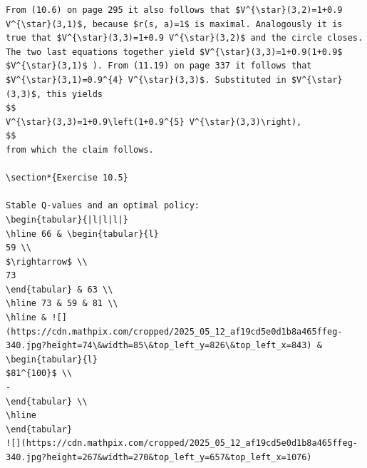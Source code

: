 \documentclass[10pt]{book}
\begin{document}
\begin{center}
\begin{enumerate}
\begin{center}
\begin{center}
\begin{center}
\begin{center}
\begin{center}
\begin{verbatim}
From (10.6) on page 295 it also follows that $V^{\star}(3,2)=1+0.9 V^{\star}(3,1)$, because $r(s, a)=1$ is maximal. Analogously it is true that $V^{\star}(3,3)=1+0.9 V^{\star}(3,2)$ and the circle closes. The two last equations together yield $V^{\star}(3,3)=1+0.9(1+0.9$ $V^{\star}(3,1)$ ). From (11.19) on page 337 it follows that $V^{\star}(3,1)=0.9^{4} V^{\star}(3,3)$. Substituted in $V^{\star}(3,3)$, this yields
$$
V^{\star}(3,3)=1+0.9\left(1+0.9^{5} V^{\star}(3,3)\right),
$$
from which the claim follows.

\section*{Exercise 10.5}

Stable Q-values and an optimal policy:
\begin{tabular}{|l|l|l|}
\hline 66 & \begin{tabular}{l}
59 \\
$\rightarrow$ \\
73
\end{tabular} & 63 \\
\hline 73 & 59 & 81 \\
\hline & ![](https://cdn.mathpix.com/cropped/2025_05_12_af19cd5e0d1b8a465ffeg-340.jpg?height=74\&width=85\&top_left_y=826\&top_left_x=843) & \begin{tabular}{l}
$81^{100}$ \\
-
\end{tabular} \\
\hline
\end{tabular}
![](https://cdn.mathpix.com/cropped/2025_05_12_af19cd5e0d1b8a465ffeg-340.jpg?height=267&width=270&top_left_y=657&top_left_x=1076)


\end{verbatim}
\end{center}
\end{center}
\end{center}
\end{center}
\end{center}
\end{enumerate}
\end{center}
\end{document}
